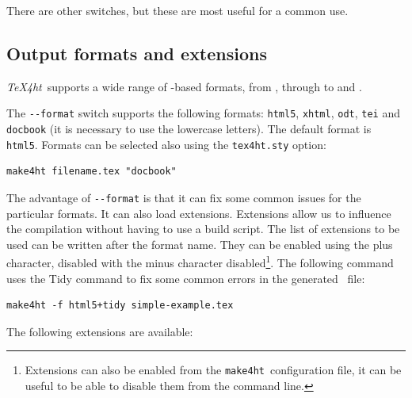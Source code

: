 \documentclass{ltugproc}
\newcommand\term[1]{\textit{#1}}
\newcommand\command[1]{\texttt{#1}}
\newcommand\packagename[1]{\texttt{#1\-.sty}}
\newcommand\texfourht{\term{\TeX\-4ht}}
\newcommand\makefourht{\command{make4ht}}
\newcommand\switch[1]{\texttt{-\/-#1}}
\begin{document}
There are other switches, but these are most useful for a common use.


\subsection{Output formats and extensions}

\texfourht\ supports a wide range of \XML-based formats, from , through  to
 and . 

The \switch{format} switch supports the following formats: \command{html5}, \command{xhtml}, \command{odt}, \command{tei} and \command{docbook} (it is necessary to use the lowercase letters). 
The default format is \command{html5}. Formats can be selected also using the \packagename{tex4ht} option:

\begin{verbatim}
make4ht filename.tex "docbook"
\end{verbatim}

The advantage of \switch{format} is that it can fix some common issues for the particular formats. 
It can also load extensions. Extensions allow us to influence the compilation
without having to use a build script. The list of extensions to be used can be
written after the format name. They can be  enabled using the plus character,
disabled with the minus character disabled\footnote{Extensions can also be
enabled from the \makefourht\ configuration file, it can be useful to be able
to disable them from  the command line.}. The following command uses the \HTML
Tidy command to fix some common errors in the generated \HTML\ file:


\begin{verbatim}
make4ht -f html5+tidy simple-example.tex
\end{verbatim}

The following extensions are available:

 
\end{document}

